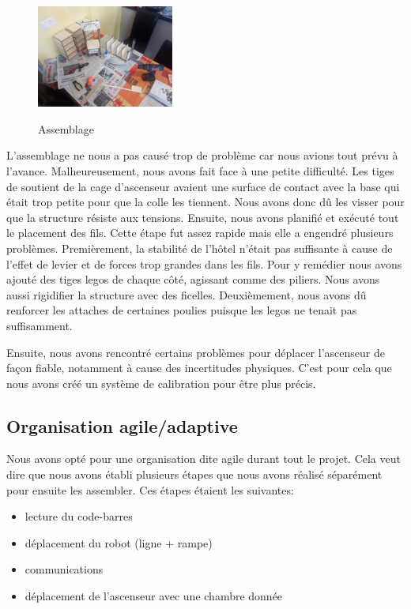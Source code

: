 \begin{figure}[H]
  \hspace{1em}
  \includegraphics[width=0.4\textwidth]{building_process/assemblage_6}\\
  \caption{Assemblage}
  \label{fig:assemblage}
\end{figure}

L'assemblage ne nous a pas causé trop de problème car nous avions tout prévu à l'avance. Malheureusement, nous avons fait face à une petite difficulté.
Les tiges de soutient de la cage d'ascenseur avaient une surface de contact avec la base qui était trop petite pour que la colle les tiennent.
Nous avons donc dû les visser pour que la structure résiste aux tensions.
Ensuite, nous avons planifié et exécuté tout le placement des fils. Cette étape fut assez rapide mais elle a engendré plusieurs problèmes.
Premièrement, la stabilité de l'hôtel n'était pas suffisante à cause de l'effet de levier et de forces trop grandes dans les fils.
Pour y remédier nous avons ajouté des tiges legos de chaque côté, agissant comme des piliers. Nous avons aussi rigidifier la structure avec des ficelles.
Deuxièmement, nous avons dû renforcer les attaches de certaines poulies puisque les legos ne tenait pas suffisamment.

Ensuite, nous avons rencontré certains problèmes pour déplacer l'ascenseur de façon fiable, notamment à cause des incertitudes physiques.
C'est pour cela que nous avons créé un système de calibration pour être plus précis.

\subsection{Organisation agile/adaptive}

Nous avons opté pour une organisation dite agile durant tout le projet. Cela veut dire que nous avons établi plusieurs étapes que nous avons réalisé séparément pour ensuite
les assembler. Ces étapes étaient les suivantes:
\begin{itemize}
  \item lecture du code-barres
  \item déplacement du robot (ligne + rampe)
  \item communications
  \item déplacement de l'ascenseur avec une chambre donnée
\end{itemize}

